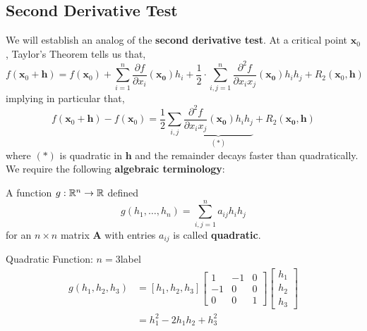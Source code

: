 \subsection{Second Derivative Test}
We will establish an analog of the \textbf{second derivative test}. At a critical point $\mathbf{x}_0$, Taylor's Theorem tells us that,
\[f\left(\mathbf{x}_0+\mathbf{h}\right)=f\left(\mathbf{x}_0\right)+\sum_{i=1}^n \frac{\partial f}{\partial x_i}\left(\mathbf{x_0}\right) h_i+ \frac{1}{2} \cdot \sum_{i, j=1}^n \frac{\partial^2 f}{\partial x_i x_j}\left(\mathbf{x_0}\right) h_i h_j+R_2\left(\mathbf{x}_0, \mathbf{h}\right)\]
implying in particular that,
\[f\left(\mathbf{x}_0+\mathbf{h}\right)-f\left(\mathbf{x}_0\right)= \frac{1}{2} \sum_{i, j} \underbrace{\frac{\partial^2 f}{\partial x_i x_j}\left(\mathbf{x_0}\right) h_i h_j}_{(*)}+R_2\left(\mathbf{x_0}, \mathbf{h}\right)\]
where $(*)$ is quadratic in $\mathbf{h}$ and the remainder decays faster than quadratically. We require the following \textbf{algebraic terminology}:

\begin{defn}
    A function $g: \mathbb{R}^n \rightarrow \mathbb{R}$ defined
    \[g\left(h_1, \ldots, h_n\right) = \sum_{i, j=1}^n a_{i j} h_i h_j\]
    for an $n \times n$ matrix $\mathbf{A}$ with entries $a_{i j}$ is called \textbf{quadratic}.
\end{defn}

\begin{ex}{Quadratic Function: $n = 3$}{label}
    \begin{align*}
        g\left(h_1, h_2, h_3\right)
        &=\left[h_1, h_2, h_3\right]\left[\begin{array}{rrr}
        1 & -1 & 0 \\
        -1 & 0 & 0 \\
        0 & 0 & 1
        \end{array}\right]\left[\begin{array}{l}
        h_1 \\
        h_2 \\
        h_3
        \end{array}\right] \\
        &=h_1^2-2 h_1 h_2+h_3^2
        \end{align*}
\end{ex}

